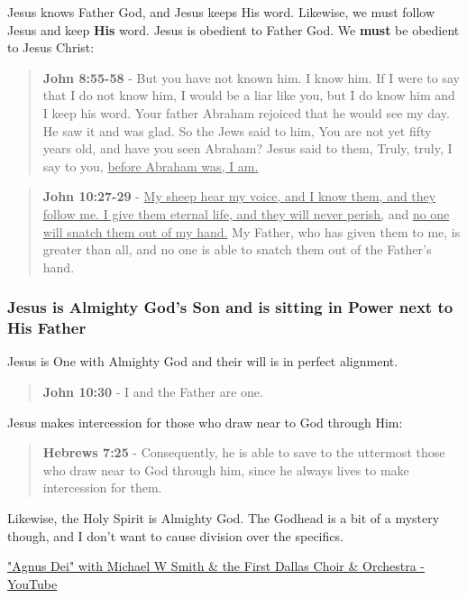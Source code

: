 \documentclass[11pt]{article}
\begin{document}
Jesus knows Father God, and Jesus keeps His word. Likewise, we must follow Jesus and keep \textbf{His} word. Jesus is obedient to Father God. We \textbf{must} be obedient to Jesus Christ:

\begin{quote}
\textbf{John 8:55-58} - But you have not known him. I know him. If I were to say that I do not know him, I would be a liar like you, but I do know him and I keep his word. Your father Abraham rejoiced that he would see my day. He saw it and was glad. So the Jews said to him, You are not yet fifty years old, and have you seen Abraham? Jesus said to them, Truly, truly, I say to you, \uline{before Abraham was, I am.}
\end{quote}

\begin{quote}
\textbf{John 10:27-29} - \uline{My sheep hear my voice, and I know them, and they follow me. I give them eternal life, and they will never perish,} and \uline{no one will snatch them out of my hand.} My Father, who has given them to me, is greater than all, and no one is able to snatch them out of the Father's hand.
\end{quote}

\subsubsection{Jesus is Almighty God's Son and is sitting in Power next to His Father}
\label{sec:org50e6b9b}
Jesus is One with Almighty God and their will is in perfect alignment.

\begin{quote}
\textbf{John 10:30} - I and the Father are one.
\end{quote}

Jesus makes intercession for those who draw near to God through Him:

\begin{quote}
\textbf{Hebrews 7:25} - Consequently, he is able to save to the uttermost those who draw near to God through him, since he always lives to make intercession for them.
\end{quote}

Likewise, the Holy Spirit is Almighty God. The Godhead is a bit of a mystery though, and I don't want to cause division over the specifics.

\href{https://www.youtube.com/watch?v=db0t\_NUq5bw}{"Agnus Dei" with Michael W  Smith \& the First Dallas Choir \& Orchestra - YouTube}
\end{document}

